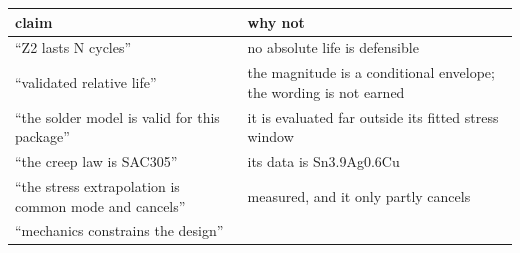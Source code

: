 \documentclass[10pt,]{article}
\begin{document}
\begin{longtable}[]{@{}ll@{}}
\toprule
\begin{minipage}[b]{0.47\columnwidth}\raggedright
claim\strut
\end{minipage} & \begin{minipage}[b]{0.47\columnwidth}\raggedright
why not\strut
\end{minipage}\tabularnewline
\midrule
\endhead
\begin{minipage}[t]{0.47\columnwidth}\raggedright
``Z2 lasts N cycles''\strut
\end{minipage} & \begin{minipage}[t]{0.47\columnwidth}\raggedright
no absolute life is defensible\strut
\end{minipage}\tabularnewline
\begin{minipage}[t]{0.47\columnwidth}\raggedright
``validated relative life''\strut
\end{minipage} & \begin{minipage}[t]{0.47\columnwidth}\raggedright
the magnitude is a conditional envelope; the wording is not earned\strut
\end{minipage}\tabularnewline
\begin{minipage}[t]{0.47\columnwidth}\raggedright
``the solder model is valid for this package''\strut
\end{minipage} & \begin{minipage}[t]{0.47\columnwidth}\raggedright
it is evaluated far outside its fitted stress window\strut
\end{minipage}\tabularnewline
\begin{minipage}[t]{0.47\columnwidth}\raggedright
``the creep law is SAC305''\strut
\end{minipage} & \begin{minipage}[t]{0.47\columnwidth}\raggedright
its data is Sn3.9Ag0.6Cu\strut
\end{minipage}\tabularnewline
\begin{minipage}[t]{0.47\columnwidth}\raggedright
``the stress extrapolation is common mode and cancels''\strut
\end{minipage} & \begin{minipage}[t]{0.47\columnwidth}\raggedright
measured, and it only partly cancels\strut
\end{minipage}\tabularnewline
\begin{minipage}[t]{0.47\columnwidth}\raggedright
``mechanics constrains the design''\strut
\end{minipage} & \begin{minipage}[t]{0.47\columnwidth}\raggedright

\end{minipage}
\end{longtable}
\end{document}
